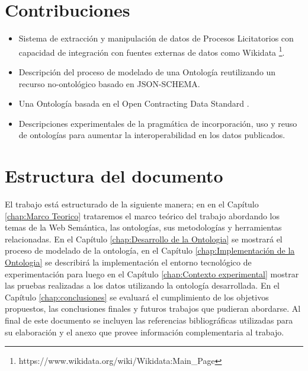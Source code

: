 \section{Contribuciones}
\label{Contribuciones}
\begin{itemize}
\item \label{contrib:1}Sistema de extracción y manipulación de datos de Procesos Licitatorios con capacidad de integración con fuentes externas de datos como Wikidata \footnote{https://www.wikidata.org/wiki/Wikidata:Main\_Page}.
\item \label{contrib:2}Descripción del proceso de modelado de una Ontología reutilizando un recurso no-ontológico basado en JSON-SCHEMA\cite {JSONSche10:online}.
\item \label{contrib:3}Una Ontología basada en el Open Contracting Data Standard \cite{OCDSReleaseSchema:online}.
\item \label{contrib:4}Descripciones experimentales de la pragmática de incorporación, uso y reuso de ontologías para aumentar la interoperabilidad en los datos publicados.

\end{itemize}
 

\section{Estructura del documento}
El trabajo está estructurado de la siguiente manera; en  en el  Capítulo \ref{chap:Marco Teorico}  trataremos el marco teórico del trabajo abordando los temas de la Web Semántica, las ontologías, sus metodologías y herramientas relacionadas. En el Capítulo \ref{chap:Desarrollo de la Ontologia} se mostrará el proceso de modelado de la ontología, en el Capítulo \ref{chap:Implementación de la Ontologia} se describirá la implementación el entorno tecnológico de experimentación para luego en el Capítulo  \ref{chap:Contexto experimental} mostrar las pruebas realizadas a los datos utilizando la ontología desarrollada. En el Capítulo \ref{chap:conclusiones} se evaluará el cumplimiento de los objetivos propuestos, las conclusiones finales y futuros trabajos que pudieran abordarse. Al final de este documento  se  incluyen las referencias bibliográficas utilizadas para su elaboración y el anexo que provee información complementaria al trabajo.


